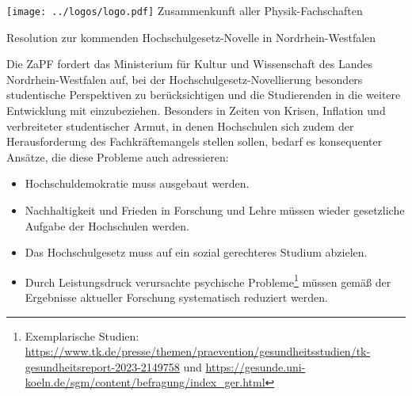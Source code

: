 \documentclass[DIV=calc]{scrartcl}
\begin{document}
\hspace{0.87\textwidth}
\begin{minipage}{120pt}
	\vspace{-1.8cm}
	\texttt{[image: ../logos/logo.pdf]}
	\centering
	\small Zusammenkunft aller Physik-Fachschaften
\end{minipage}

\begin{center}
  \huge{Resolution zur kommenden Hochschulgesetz-Novelle in Nordrhein-Westfalen}\vspace{.25\baselineskip}\\
  \normalsize
\end{center}
\vspace{1cm}






Die ZaPF fordert das Ministerium für Kultur und Wissenschaft des Landes Nordrhein-Westfalen auf, bei der Hochschulgesetz-Novellierung besonders studentische Perspektiven zu berücksichtigen und die Studierenden in die weitere Entwicklung mit einzubeziehen. Besonders in Zeiten von Krisen, Inflation und verbreiteter studentischer Armut, in denen Hochschulen sich zudem der Herausforderung des Fachkräftemangels stellen sollen, bedarf es konsequenter Ansätze, die diese Probleme auch adressieren:

\begin{itemize}
    \item Hochschuldemokratie muss ausgebaut werden.
    \item Nachhaltigkeit und Frieden in Forschung und Lehre müssen wieder gesetzliche Aufgabe der Hochschulen werden.
    \item Das Hochschulgesetz muss auf ein sozial gerechteres Studium abzielen.
    \item Durch Leistungsdruck verursachte psychische Probleme\footnote{Exemplarische Studien: \url{https://www.tk.de/presse/themen/praevention/gesundheitsstudien/tk-gesundheitsreport-2023-2149758} und \url{https://gesunde.uni-koeln.de/sgm/content/befragung/index_ger.html}} müssen gemäß der Ergebnisse aktueller Forschung systematisch reduziert werden.
\end{itemize}
\end{document}
